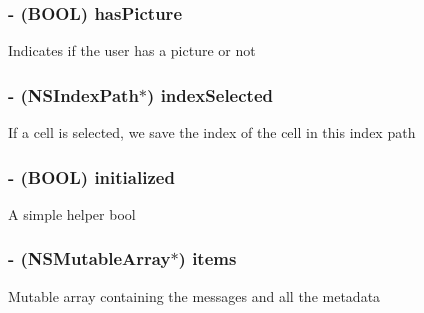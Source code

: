 \subsubsection[{has\+Picture}]{\setlength{\rightskip}{0pt plus 5cm}-\/ (B\+O\+O\+L) has\+Picture\hspace{0.3cm}{\ttfamily [protected]}}\label{category_e_s_chat_view_07_08_a20cb702c2056f87f259c409b897db21d}
Indicates if the user has a picture or not \hypertarget{category_e_s_chat_view_07_08_ada473e3981b341df2894d0423ffc1726}{}
\subsubsection[{index\+Selected}]{\setlength{\rightskip}{0pt plus 5cm}-\/ (N\+S\+Index\+Path$\ast$) index\+Selected\hspace{0.3cm}{\ttfamily [protected]}}\label{category_e_s_chat_view_07_08_ada473e3981b341df2894d0423ffc1726}
If a cell is selected, we save the index of the cell in this index path \hypertarget{category_e_s_chat_view_07_08_a22da8049924ecf54ef6813ab286405bb}{}
\subsubsection[{initialized}]{\setlength{\rightskip}{0pt plus 5cm}-\/ (B\+O\+O\+L) initialized\hspace{0.3cm}{\ttfamily [protected]}}\label{category_e_s_chat_view_07_08_a22da8049924ecf54ef6813ab286405bb}
A simple helper bool \hypertarget{category_e_s_chat_view_07_08_ad54c5f3be09a77064859e621a179c7bc}{}
\subsubsection[{items}]{\setlength{\rightskip}{0pt plus 5cm}-\/ (N\+S\+Mutable\+Array$\ast$) items\hspace{0.3cm}{\ttfamily [protected]}}\label{category_e_s_chat_view_07_08_ad54c5f3be09a77064859e621a179c7bc}
Mutable array containing the messages and all the metadata \hypertarget{category_e_s_chat_view_07_08_a5022765b26e43b5f9fcdfa24a794c3c2}{}
